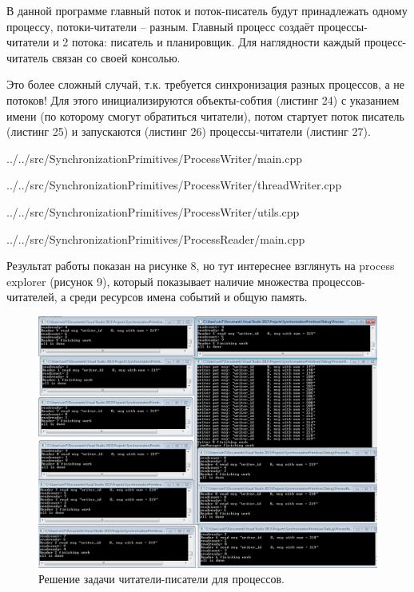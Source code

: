 \documentclass[a4paper, 12pt]{article}		%
\begin{document}
В данной программе главный поток и поток-писатель будут принадлежать одному процессу, потоки-читатели – разным. Главный процесс создаёт процессы-читатели и 2 потока: писатель и планировщик. Для наглядности каждый процесс-читатель связан со своей консолью.

Это более сложный случай, т.к. требуется синхронизация разных процессов, а не потоков! Для этого инициализируются объекты-собтия (листинг 24) с указанием имени (по которому смогут обратиться читатели), потом стартует поток писатель (листинг 25) и запускаются (листинг 26) процессы-читатели (листинг 27).


{../../src/SynchronizationPrimitives/ProcessWriter/main.cpp}


{../../src/SynchronizationPrimitives/ProcessWriter/threadWriter.cpp}
\newpage


{../../src/SynchronizationPrimitives/ProcessWriter/utils.cpp}


{../../src/SynchronizationPrimitives/ProcessReader/main.cpp}

Результат работы показан на рисунке 8, но тут интереснее взглянуть на process explorer (рисунок 9), который показывает наличие множества процессов-читателей, а среди ресурсов имена событий и общую память.

\begin{figure}[h!]
\centering
\includegraphics[scale=0.45]{res/007}
\caption{Решение задачи читатели-писатели для процессов.}
\end{figure}
\end{document}
